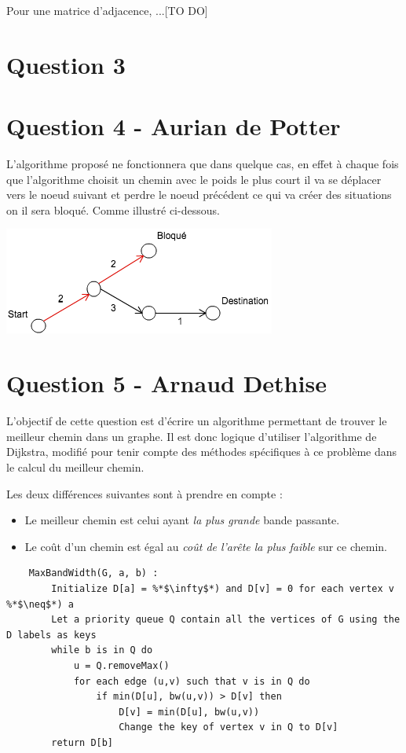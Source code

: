 \documentclass[10pt,a4paper]{article}
\begin{document}
Pour une matrice d'adjacence, ...[TO DO]

\section*{Question 3}
\section*{Question 4 - Aurian de Potter}
L'algorithme proposé ne fonctionnera que dans quelque cas, en effet à chaque fois que l'algorithme choisit un chemin avec le poids le plus court il va se déplacer vers le noeud suivant et perdre le noeud précédent ce qui va créer des situations on il sera bloqué. Comme illustré ci-dessous.

\begin{center}
    \includegraphics[scale=0.7]{ex.png}
\end{center}

\section*{Question 5 - Arnaud Dethise}

	L'objectif de cette question est d'écrire un algorithme permettant de trouver le meilleur chemin dans un graphe. 
	Il est donc logique d'utiliser l'algorithme de Dijkstra, modifié pour tenir compte des méthodes spécifiques à ce problème dans le calcul du meilleur chemin.
	
	Les deux différences suivantes sont à prendre en compte :
	\begin{itemize}
	\item Le meilleur chemin est celui ayant \textit{la plus grande} bande passante.
	\item Le coût d'un chemin est égal au \textit{coût de l'arête la plus faible} sur ce chemin.
	\end{itemize}
	
	\begin{lstlisting}
	MaxBandWidth(G, a, b) :
		Initialize D[a] = %*$\infty$*) and D[v] = 0 for each vertex v %*$\neq$*) a
		Let a priority queue Q contain all the vertices of G using the D labels as keys
		while b is in Q do
			u = Q.removeMax()
			for each edge (u,v) such that v is in Q do
				if min(D[u], bw(u,v)) > D[v] then
					D[v] = min(D[u], bw(u,v))
					Change the key of vertex v in Q to D[v]
		return D[b]
	\end{lstlisting}
\end{document}

